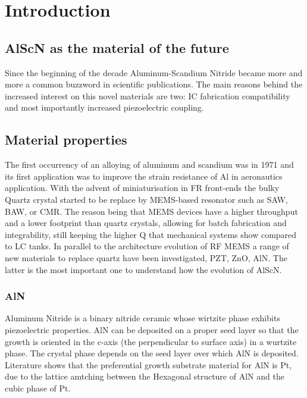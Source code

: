 \cleardoublepage
\chapter{Introduction}

\section{AlScN as the material of the future}
Since the beginning of the decade Aluminum-Scandium Nitride became more and more a common buzzword in scientific publications. The main reasons behind the increased interest on this novel materials are two: IC fabrication compatibility and most importantly increased piezoelectric coupling. 


\section{Material properties }
The first occurrency of an alloying of aluminum and scandium was in 1971 \cite{caro_piezoelectric_2015} and its first application was to improve the strain resistance of Al in aeronautics application. With the advent of miniaturisation in FR front-ends the bulky Quartz crystal started to be replace by MEMS-based resonator such as SAW, BAW, or CMR. The reason being that MEMS devices have a higher throughput and a lower footprint than quartz crystals, allowing for batch fabrication and integrability, still keeping the higher Q that mechanical systems show compared to LC tanks. In parallel to the architecture evolution of RF MEMS a range of new materials to replace quartz have been investigated, PZT, ZnO, AlN. The latter is the most important one to understand how the evolution of AlScN.

\subsection{AlN}
Aluminum Nitride is a binary nitride ceramic whose wirtzite phase exhibits piezoelectric properties. AlN can be deposited on a proper seed layer so that the growth is oriented in the c-axis (the perpendicular to surface axis) in a wurtzite phase. The crystal phase depends on the seed layer over which AlN is deposited. Literature \cite{xiong_influence_2010} shows that the preferential growth substrate material for AlN is Pt, due to the lattice amtching between the Hexagonal structure of AlN and the cubic phase of Pt. 

